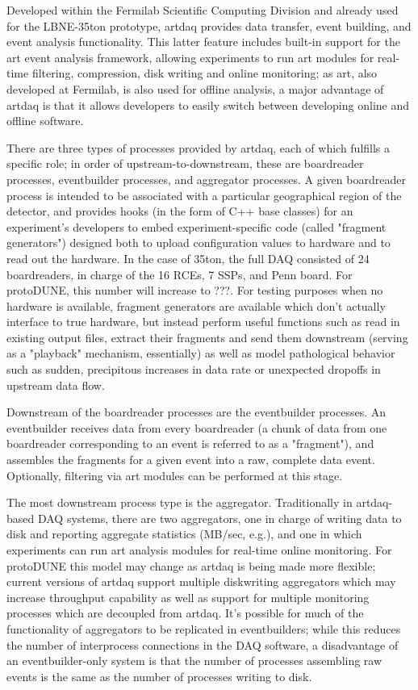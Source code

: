 Developed within the Fermilab Scientific Computing Division and
already used for the LBNE-35ton prototype, artdaq provides data
transfer, event building, and event analysis functionality. This
latter feature includes built-in support for the art event analysis
framework, allowing experiments to run art modules for real-time
filtering, compression, disk writing and online monitoring; as art,
also developed at Fermilab, is also used for offline analysis, a major
advantage of artdaq is that it allows developers to easily switch
between developing online and offline software.

There are three types of processes provided by artdaq, each of which
fulfills a specific role; in order of upstream-to-downstream, these
are boardreader processes, eventbuilder processes, and aggregator
processes. A given boardreader process is intended to be associated
with a particular geographical region of the detector, and provides
hooks (in the form of C++ base classes) for an experiment's developers
to embed experiment-specific code (called "fragment generators")
designed both to upload configuration values to hardware and to read
out the hardware. In the case of 35ton, the full DAQ consisted of 24
boardreaders, in charge of the 16 RCEs, 7 SSPs, and Penn board. For
protoDUNE, this number will increase to ???. 
For testing purposes when
no hardware is available, fragment generators are available which
don't actually interface to true hardware, but instead perform useful
functions such as read in existing output files, extract their
fragments and send them downstream (serving as a "playback" mechanism,
essentially) as well as model pathological behavior such as sudden,
precipitous increases in data rate or unexpected dropoffs in upstream
data flow.

Downstream of the boardreader processes are the eventbuilder
processes. An eventbuilder receives data from every boardreader (a
chunk of data from one boardreader corresponding to an event is
referred to as a "fragment"), and assembles the fragments for a given
event into a raw, complete data event. Optionally, filtering via art
modules can be performed at this stage.

The most downstream process type is the aggregator. Traditionally in
artdaq-based DAQ systems, there are two aggregators, one in charge of
writing data to disk and reporting aggregate statistics (MB/sec,
e.g.), and one in which experiments can run art analysis modules for
real-time online monitoring. For protoDUNE this model may change as
artdaq is being made more flexible; current versions of artdaq support
multiple diskwriting aggregators which may increase throughput
capability as well as support for multiple monitoring processes which
are decoupled from artdaq. It's possible for much of the functionality
of aggregators to be replicated in eventbuilders; while this reduces
the number of interprocess connections in the DAQ software, a
disadvantage of an eventbuilder-only system is that the number of
processes assembling raw events is the same as the number of processes
writing to disk.

